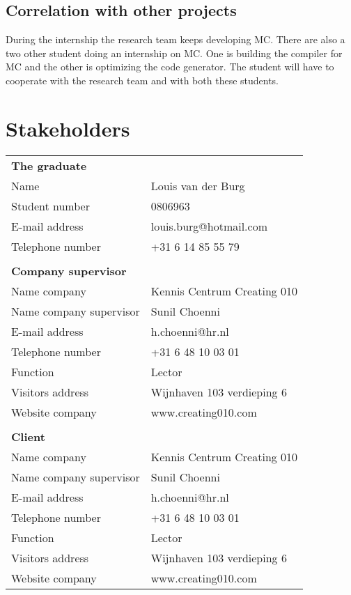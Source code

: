 \section{Correlation with other projects}
During the internship the research team keeps developing MC.
There are also a two other student doing an internship on MC.
One is building the compiler for MC and the other is optimizing the code generator.
The student will have to cooperate with the research team and with both these students.

\chapter{Stakeholders}
   \begin{tabular}
      { l l }
      \textbf{The graduate} & \\
      Name & Louis van der Burg \\
      Student number & 0806963 \\
      E-mail address & louis.burg@hotmail.com \\
      Telephone number & +31 6 14 85 55 79 \\
      & \\
      \textbf{Company supervisor} & \\
      Name company & Kennis Centrum Creating 010 \\
      Name company supervisor & Sunil Choenni \\
      E-mail address & h.choenni@hr.nl \\
      Telephone number & +31 6 48 10 03 01  \\
      Function & Lector \\
      Visitors address & Wijnhaven 103 verdieping 6 \\
      Website company & www.creating010.com \\
      & \\
      \textbf{Client} & \\
      Name company & Kennis Centrum Creating 010 \\
      Name company supervisor & Sunil Choenni \\
      E-mail address & h.choenni@hr.nl \\
      Telephone number & +31 6 48 10 03 01  \\
      Function & Lector \\
      Visitors address & Wijnhaven 103 verdieping 6 \\
      Website company & www.creating010.com \\

\end{tabular}
